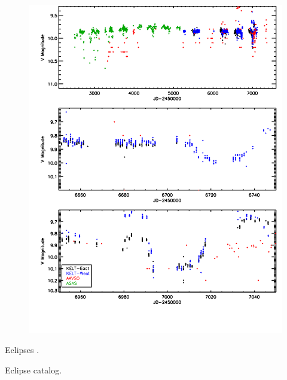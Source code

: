 \documentclass{aastex6}
\begin{document}
\begin{figure}[htb]
\begin{center}
  \includegraphics[width=\textwidth]{KELT_eclipses.pdf}
  \end{center}
\end{figure}

Eclipses \citep{shevchenko92,shevchenko98}.

Eclipse catalog.
\end{document}
